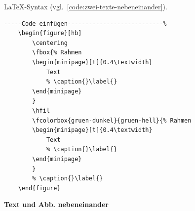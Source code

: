 \LaTeX -Syntax (vgl.~\ref{code:zwei-texte-nebeneinander}). 
\begin{lstlisting}[caption={zwei Texte nebeneinander },label={code:zwei-texte-nebeneinander},language=TeX% C, TeX, Bash, Python
]-----Code einfügen---------------------------%
	\begin{figure}[hb]
		\centering
		\fbox{% Rahmen
		\begin{minipage}[t]{0.4\textwidth} 
			Text
			% \caption{}\label{}
		\end{minipage}
		}
		\hfil
		\fcolorbox{gruen-dunkel}{gruen-hell}{% Rahmen
		\begin{minipage}[t]{0.4\textwidth}
			Text
			% \caption{}\label{}
		\end{minipage}
		}
		% \caption{}\label{}
	\end{figure}
\end{lstlisting}

\clearpage
\textbf{Text und Abb. nebeneinander}\\

